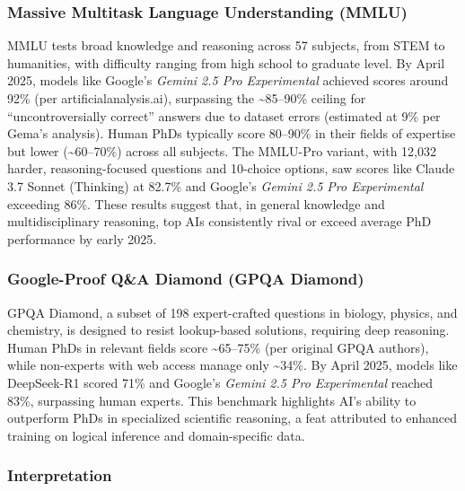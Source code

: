 \subsubsection{Massive Multitask Language Understanding
(MMLU)}\label{massive-multitask-language-understanding-mmlu}

MMLU tests broad knowledge and reasoning across 57 subjects, from STEM
to humanities, with difficulty ranging from high school to graduate
level. By April 2025, models like Google's \emph{Gemini 2.5 Pro
Experimental} achieved scores around 92\% (per artificialanalysis.ai),
surpassing the \textasciitilde85--90\% ceiling for ``uncontroversially
correct'' answers due to dataset errors (estimated at 9\% per Gema's
analysis). Human PhDs typically score 80--90\% in their fields of
expertise but lower (\textasciitilde60--70\%) across all subjects. The
MMLU-Pro variant, with 12,032 harder, reasoning-focused questions and
10-choice options, saw scores like Claude 3.7 Sonnet (Thinking) at
82.7\% and Google's \emph{Gemini 2.5 Pro Experimental} exceeding 86\%.
These results suggest that, in general knowledge and multidisciplinary
reasoning, top AIs consistently rival or exceed average PhD performance
by early 2025.

\subsubsection{Google-Proof Q\&A Diamond (GPQA
Diamond)}\label{google-proof-qa-diamond-gpqa-diamond}

GPQA Diamond, a subset of 198 expert-crafted questions in biology,
physics, and chemistry, is designed to resist lookup-based solutions,
requiring deep reasoning. Human PhDs in relevant fields score
\textasciitilde65--75\% (per original GPQA authors), while non-experts
with web access manage only \textasciitilde34\%. By April 2025, models
like DeepSeek-R1 scored 71\% and Google's \emph{Gemini 2.5 Pro
Experimental} reached 83\%, surpassing human experts. This benchmark
highlights AI's ability to outperform PhDs in specialized scientific
reasoning, a feat attributed to enhanced training on logical inference
and domain-specific data.

\subsubsection{Interpretation}\label{interpretation}

